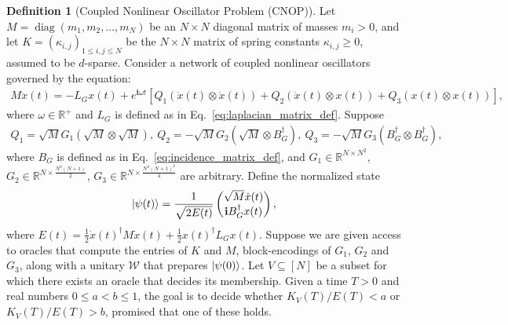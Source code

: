 \documentclass[10pt,a4paper]{amsart}
\theoremstyle{plain}
\theoremstyle{definition}
\newtheorem{definition}[thm]{Definition}
\theoremstyle{remark}
\newcommand{\lrb}[1]{\left ( #1 \right )}
\newcommand{\lrsb}[1]{\left [ #1 \right ]}
\newcommand{\diag}[1]{\operatorname{diag}\lrb{#1}}
\renewcommand{\i}{\ensuremath{\mathbf{i}}}
\newcommand{\R}{\mathbb{R}}
\begin{document}
\begin{definition}[Coupled Nonlinear Oscillator Problem (CNOP)]
Let $M=\diag{m_1,m_2,\dots,m_N}$ be an $N \times N$ diagonal matrix of masses $m_i>0$, and let $K=(\kappa_{i,j})_{1\le i,j\le N}$ be the $N\times N$ matrix of spring constants $\kappa_{i,j} \ge 0$, assumed to be $d$-sparse. Consider a network of coupled nonlinear oscillators governed by the equation:
\begin{align}
M\ddot{x}(t) = -L_G x(t)+ e^{\i \omega t}\lrsb{Q_1 (\dot{x}(t) \otimes \dot{x}(t)) + Q_2 (\dot{x}(t) \otimes x(t)) + Q_3 (x(t)\otimes x(t))
},
\end{align}
where $\omega \in \R^+$ and $L_G$ is defined as in Eq.~\eqref{eq:laplacian_matrix_def}. Suppose
\begin{align}
Q_1 = \sqrt{M} G_1 \lrb{\sqrt{M}\otimes \sqrt{M}},
~Q_2 = -\sqrt{M} G_2 \lrb{\sqrt{M} \otimes B_G^\dagger}, 
~Q_3 = -\sqrt{M} G_3 \lrb{B_G^\dagger \otimes B_G^\dagger},   
\end{align}
where $B_G$ is defined as in Eq.~\eqref{eq:incidence_matrix_def}, and
$G_1 \in \R^{N \times N^2}$, $G_2 \in \R^{N \times \frac{N^2(N+1)}{2}}$,
$G_3 \in \R^{N \times \frac{N^2(N+1)^2}{4}}$ are arbitrary.
Define the normalized state 
\begin{align}
\ket{\psi(t)}=\frac{1}{\sqrt{2E(t)}}\begin{pmatrix}
    \sqrt{M}\dot{x}(t) \\
    \i B_G^\dagger x(t)
\end{pmatrix},
\end{align} 
where $E(t)=\frac{1}{2}\dot{x}(t)^\dagger M \dot{x}(t)+\frac{1}{2}x(t)^\dagger L_G x(t)$. Suppose we are given access to oracles that compute the entries of $K$ and $M$, block-encodings of $G_1$, $G_2$ and $G_3$, along with a unitary $\mathcal{W}$ that prepares $\ket{\psi(0)}$. 
Let $V \subseteq [N]$ be a subset for which there exists an oracle that decides its membership. Given a time $T>0$ and real numbers $0\le a < b \le 1$, the goal is to decide whether $K_V(T)/E(T) <a$ or $K_V(T)/E(T) > b$, promised that one of these holds.    
\end{definition}
\end{document}

